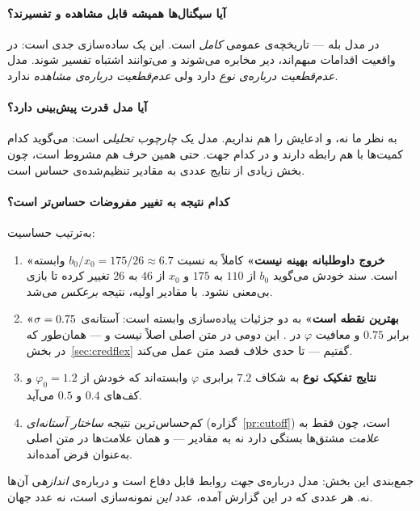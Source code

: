 \documentclass[12pt,a4paper]{article}
\begin{document}
\paragraph{آیا سیگنال‌ها همیشه قابل مشاهده و تفسیرند؟}
در مدل بله — تاریخچه‌ی عمومی \emph{کامل} است. این یک ساده‌سازی جدی است:
در واقعیت اقدامات مبهم‌اند، دیر مخابره می‌شوند و می‌توانند اشتباه تفسیر شوند.
مدل \emph{عدم‌قطعیت درباره‌ی نوع} دارد ولی \emph{عدم‌قطعیت درباره‌ی مشاهده}
ندارد.

\paragraph{آیا مدل قدرت پیش‌بینی دارد؟}
به نظر ما نه، و ادعایش را هم نداریم. مدل یک \emph{چارچوب تحلیلی} است:
می‌گوید کدام کمیت‌ها با هم رابطه دارند و در کدام جهت. حتی همین حرف هم مشروط
است، چون بخش زیادی از نتایج عددی به مقادیر تنظیم‌شده‌ی
 حساس است.

\paragraph{کدام نتیجه به تغییر مفروضات حساس‌تر است؟}
به‌ترتیب حساسیت:
\begin{enumerate}[leftmargin=1.7em,itemsep=2pt]
  \item \textbf{«خروج داوطلبانه بهینه نیست»} کاملاً به نسبت
        $b_0/x_0=175/26\approx6.7$ وابسته است. سند  خودش
        می‌گوید $b_0$ از $110$ به $175$ و $x_0$ از $46$ به $26$ تغییر کرده
        تا بازی بی‌معنی نشود. با مقادیر اولیه، نتیجه \emph{برعکس} می‌شد.
  \item \textbf{«$\sigma=0.75$ بهترین نقطه است»} به دو جزئیات پیاده‌سازی
        وابسته است: آستانه‌ی  برابر $0.75$ و معافیت $\varphi$
        در . این دومی در متن اصلی اصلاً نیست و — همان‌طور که در
        بخش~\ref{sec:credflex} گفتیم — تا حدی خلاف قصد متن عمل می‌کند.
  \item \textbf{نتایج تفکیک نوع} به شکاف $7.2$ برابری $\varphi$ وابسته‌اند
        که خودش از $\varphi_0=1.2$ و کف‌های $0.4$ و $0.5$ می‌آید.
  \item کم‌حساس‌ترین نتیجه \emph{ساختار آستانه‌ای} (گزاره~\ref{pr:cutoff})
        است، چون فقط به \emph{علامت} مشتق‌ها بستگی دارد نه به مقادیر — و
        همان علامت‌ها در متن اصلی به‌عنوان فرض آمده‌اند.
\end{enumerate}

\begin{keybox}
جمع‌بندی این بخش: مدل درباره‌ی \emph{جهت} روابط قابل دفاع است و درباره‌ی
\emph{اندازه}ی آن‌ها نه. هر عددی که در این گزارش آمده، عدد \emph{این}
نمونه‌سازی است، نه عدد جهان.
\end{keybox}
\end{document}

